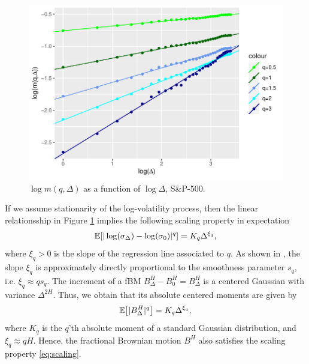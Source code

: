 \begin{figure}[H]
    \centering
    \includegraphics[scale=0.78]{fig/img/RealizedLib/Linear_Reg_rigtig.pdf}
    \caption{$\log m(q,\Delta)$ as a function of $\log\Delta$, S\&P-500.}
    \label{fig: Linear_reg}
\end{figure}
 If we assume stationarity of the log-volatility process, then the linear relationsship in Figure \ref{fig: Linear_reg} implies the following scaling property in expectation
 \begin{equation}\label{eq:scaling}
     \mathbb{E}[|\log(\sigma_{\Delta})-\log(\sigma_{0})|^{q}]=K_{q}\Delta^{\xi_{q}},
 \end{equation}
 where $\xi_{q}>0$ is the slope of the regression line associated to $q$. As shown in \cite{volisrough}, the slope $\xi_{q}$ is approximately directly proportional to the smoothness parameter $s_{q}$, i.e. $\xi_{q}\approx qs_{q}$. The increment of a fBM $B^{H}_{\Delta}-B^{H}_{0}=B^{H}_{\Delta}$ is a centered Gaussian with variance $\Delta^{2H}$. Thus, we obtain that its absolute centered moments are given by
 \begin{equation}
     \E\left[|B^{H}_{\Delta}|^{q}\right]=K_{q}\Delta^{\xi_{q}},
 \end{equation}
 where $K_{q}$ is the $q$'th absolute moment of a standard Gaussian distribution, and $\xi_{q}\approx qH$. Hence, the fractional Brownian motion $B^{H}$ also satisfies the scaling property \eqref{eq:scaling}. 
 
